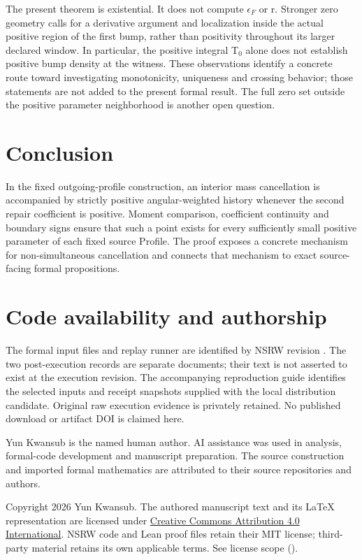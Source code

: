 \documentclass[11pt,a4paper]{article}
\begin{document}
The present theorem is existential. It does not compute \(\epsilon _F\) or r. Stronger zero geometry calls for a derivative argument and localization inside the actual positive region of the first bump, rather than positivity throughout its larger declared window. In particular, the positive integral T\ensuremath{{}_0} alone does not establish positive bump density at the witness. These observations identify a concrete route toward investigating monotonicity, uniqueness and crossing behavior; those statements are not added to the present formal result. The full zero set outside the positive parameter neighborhood is another open question.

\section{Conclusion}

In the fixed outgoing-profile construction, an interior mass cancellation is accompanied by strictly positive angular-weighted history whenever the second repair coefficient is positive. Moment comparison, coefficient continuity and boundary signs ensure that such a point exists for every sufficiently small positive parameter of each fixed source Profile. The proof exposes a concrete mechanism for non-simultaneous cancellation and connects that mechanism to exact source-facing formal propositions.

\section*{Code availability and authorship}

The formal input files and replay runner are identified by NSRW revision  \cite{ref2}. The two post-execution records \cite{ref4,ref5} are separate documents; their text is not asserted to exist at the execution revision. The accompanying reproduction guide identifies the selected inputs and receipt snapshots supplied with the local distribution candidate. Original raw execution evidence is privately retained. No published download or artifact DOI is claimed here.

Yun Kwansub is the named human author. AI assistance was used in analysis, formal-code development and manuscript preparation. The source construction and imported formal mathematics are attributed to their source repositories and authors.

Copyright \textcopyright{} 2026 Yun Kwansub. The authored manuscript text and its LaTeX representation are licensed under \href{https://creativecommons.org/licenses/by/4.0/}{Creative Commons Attribution 4.0 International}. NSRW code and Lean proof files retain their MIT license; third-party material retains its own applicable terms. See license scope ().
\end{document}
